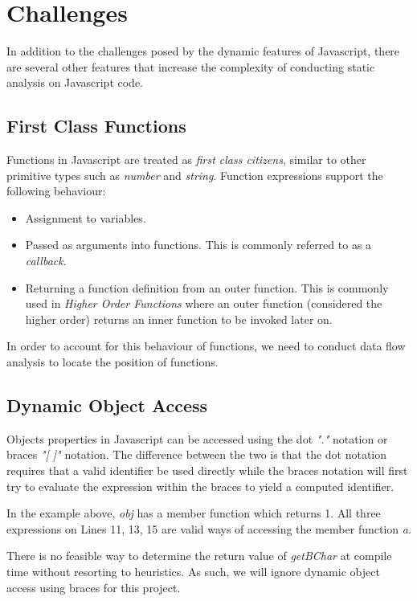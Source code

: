 \section{Challenges}

In addition to the challenges posed by the dynamic features of Javascript, there are several other features that increase the complexity of conducting static analysis on Javascript code.

\subsection{First Class Functions}

Functions in Javascript are treated as \textit{first class citizens}\parencite{firstClassFunctions}, similar to other primitive types such as \textit{number} and \textit{string}. Function expressions support the following behaviour:

\begin{itemize}
    \item{Assignment to variables.}
    \item{Passed as arguments into functions. This is commonly referred to as a \textit{callback}.}
    \item{Returning a function definition from an outer function. This is commonly used in \textit{Higher Order Functions}\parencite{functionalJs4} where an outer function (considered the higher order) returns an inner function to be invoked later on.} 
\end{itemize}

In order to account for this behaviour of functions, we need to conduct data flow analysis to locate the position of functions.

\subsection{Dynamic Object Access}

Objects properties in Javascript can be accessed using the dot \textit{"."} notation or braces \textit{"[ ]"} notation. The difference between the two is that the dot notation requires that a valid identifier\parencite{identifier} be used directly while the braces notation will first try to evaluate the expression within the braces to yield a computed identifier.



In the example above, \textit{obj} has a member function which returns 1. All three expressions on Lines 11, 13, 15 are valid ways of accessing the member function \textit{a}.

There is no feasible way to determine the return value of \textit{getBChar} at compile time without resorting to heuristics. As such, we will ignore dynamic object access using braces for this project.

